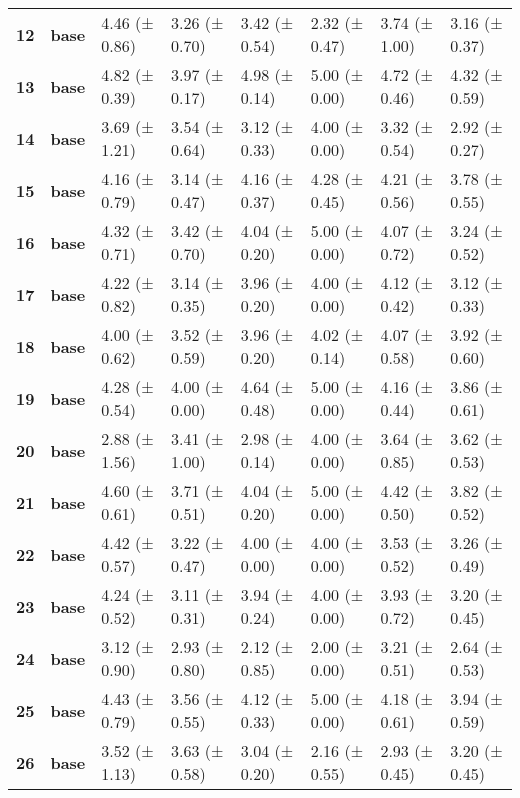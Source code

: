 \begin{longtable}{llllllll}
\cline{1-8}
\textbf{12} & \textbf{base} & 4.46 (± 0.86) & 3.26 (± 0.70) & 3.42 (± 0.54) & 2.32 (± 0.47) & 3.74 (± 1.00) & 3.16 (± 0.37) \\
\cline{1-8}
\textbf{13} & \textbf{base} & 4.82 (± 0.39) & 3.97 (± 0.17) & 4.98 (± 0.14) & 5.00 (± 0.00) & 4.72 (± 0.46) & 4.32 (± 0.59) \\
\cline{1-8}
\textbf{14} & \textbf{base} & 3.69 (± 1.21) & 3.54 (± 0.64) & 3.12 (± 0.33) & 4.00 (± 0.00) & 3.32 (± 0.54) & 2.92 (± 0.27) \\
\cline{1-8}
\textbf{15} & \textbf{base} & 4.16 (± 0.79) & 3.14 (± 0.47) & 4.16 (± 0.37) & 4.28 (± 0.45) & 4.21 (± 0.56) & 3.78 (± 0.55) \\
\cline{1-8}
\textbf{16} & \textbf{base} & 4.32 (± 0.71) & 3.42 (± 0.70) & 4.04 (± 0.20) & 5.00 (± 0.00) & 4.07 (± 0.72) & 3.24 (± 0.52) \\
\cline{1-8}
\textbf{17} & \textbf{base} & 4.22 (± 0.82) & 3.14 (± 0.35) & 3.96 (± 0.20) & 4.00 (± 0.00) & 4.12 (± 0.42) & 3.12 (± 0.33) \\
\cline{1-8}
\textbf{18} & \textbf{base} & 4.00 (± 0.62) & 3.52 (± 0.59) & 3.96 (± 0.20) & 4.02 (± 0.14) & 4.07 (± 0.58) & 3.92 (± 0.60) \\
\cline{1-8}
\textbf{19} & \textbf{base} & 4.28 (± 0.54) & 4.00 (± 0.00) & 4.64 (± 0.48) & 5.00 (± 0.00) & 4.16 (± 0.44) & 3.86 (± 0.61) \\
\cline{1-8}
\textbf{20} & \textbf{base} & 2.88 (± 1.56) & 3.41 (± 1.00) & 2.98 (± 0.14) & 4.00 (± 0.00) & 3.64 (± 0.85) & 3.62 (± 0.53) \\
\cline{1-8}
\textbf{21} & \textbf{base} & 4.60 (± 0.61) & 3.71 (± 0.51) & 4.04 (± 0.20) & 5.00 (± 0.00) & 4.42 (± 0.50) & 3.82 (± 0.52) \\
\cline{1-8}
\textbf{22} & \textbf{base} & 4.42 (± 0.57) & 3.22 (± 0.47) & 4.00 (± 0.00) & 4.00 (± 0.00) & 3.53 (± 0.52) & 3.26 (± 0.49) \\
\cline{1-8}
\textbf{23} & \textbf{base} & 4.24 (± 0.52) & 3.11 (± 0.31) & 3.94 (± 0.24) & 4.00 (± 0.00) & 3.93 (± 0.72) & 3.20 (± 0.45) \\
\cline{1-8}
\textbf{24} & \textbf{base} & 3.12 (± 0.90) & 2.93 (± 0.80) & 2.12 (± 0.85) & 2.00 (± 0.00) & 3.21 (± 0.51) & 2.64 (± 0.53) \\
\cline{1-8}
\textbf{25} & \textbf{base} & 4.43 (± 0.79) & 3.56 (± 0.55) & 4.12 (± 0.33) & 5.00 (± 0.00) & 4.18 (± 0.61) & 3.94 (± 0.59) \\
\cline{1-8}
\textbf{26} & \textbf{base} & 3.52 (± 1.13) & 3.63 (± 0.58) & 3.04 (± 0.20) & 2.16 (± 0.55) & 2.93 (± 0.45) & 3.20 (± 0.45) \\

\end{longtable}
